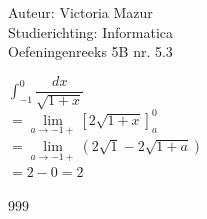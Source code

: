 \documentclass[a4paper]{article}
\begin{document}
  
\noindent \large Auteur: Victoria Mazur \\
\noindent \large Studierichting: Informatica\\
\noindent \large Oefeningenreeks 5B nr. 5.3\\

\medskip

\normalsize

$\displaystyle\int_{-1}^{0} \dfrac{dx}{\sqrt{1 + x}}$ \\

$= \lim\limits_{a \to -1+} \left[ 2\sqrt{1 + x} \right]_{a}^{0}$ \\

$= \lim\limits_{a \to -1+} \left( 2\sqrt{1} - 2\sqrt{1 + a} \right)$ \\

$= 2 - 0 = 2$ \\

\begin{thebibliography}{999}
\end{thebibliography}
\end{document}
